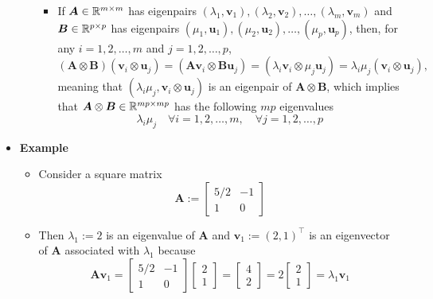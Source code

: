 \documentclass[12pt,a4paper]{article}
\begin{document}
\begin{itemize}
\begin{itemize}
\begin{itemize}
  \item If $\bm{A}\in \mathbb{R}^{m\times m}$ has eigenpairs $(\lambda_{1},\bm{v}_{1}),(\lambda_{2},\bm{v}_{2}),\ldots,(\lambda_{m},\bm{v}_{m})$
      and $\bm{B}\in \mathbb{R}^{p\times p}$ has eigenpairs $(\mu_{1},\bm{u}_{1}),(\mu_{2},\bm{u}_{2}),\ldots,(\mu_{p},\bm{u}_{p})$,
      then, for any $i=1,2, \ldots, m$ and $j=1,2, \ldots, p$,
      \begin{equation}\nonumber%
        (\bm{A}\otimes \bm{B}) (\bm{v}_{i}\otimes \bm{u}_{j})
        =
        (\bm{A}\bm{v}_{i}\otimes \bm{B}\bm{u}_{j})
        =
        (\lambda_{i}\bm{v}_{i}\otimes \mu_{j}\bm{u}_{j})
        =
        \lambda_{i}\mu_{j} (\bm{v}_{i}\otimes \bm{u}_{j}),
      \end{equation}
      meaning that $(\lambda_{i}\mu_{j}, \bm{v}_{i}\otimes \bm{u}_{j})$ is an eigenpair of $\bm{A}\otimes \bm{B}$,
      which implies that $\bm{A}\otimes \bm{B}\in \mathbb{R}^{mp\times mp}$ has the following $mp$ eigenvalues
      \begin{equation}\nonumber%
        \lambda_{i}\mu_{j} \quad \forall i = 1, 2, \ldots, m, \quad \forall j= 1,2, \ldots, p
      \end{equation}
    \end{itemize}
  \end{itemize}

\clearpage
\item \textbf{Example}
  \begin{itemize}
  \item Consider a square matrix
    \begin{equation}\nonumber%
      \bm{A} :=
      \begin{bmatrix}
        5/2 & -1 \\
        1 & 0
      \end{bmatrix}
    \end{equation}
  \item Then
    $\lambda_{1}:=2$ is an eigenvalue of $\bm{A}$
    and $\bm{v}_{1}:=(2, 1)^{\top}$ is an eigenvector of $\bm{A}$ associated with $\lambda_{1}$
    because
    \begin{equation}\nonumber%
      \bm{A}
      \bm{v}_{1}
      = 
      \begin{bmatrix}
        5/2 & -1 \\
        1 & 0
      \end{bmatrix}
      \begin{bmatrix}
        2 \\
        1
      \end{bmatrix}
      = 
      \begin{bmatrix}
        4 \\
        2
      \end{bmatrix}
      = 2
      \begin{bmatrix}
        2 \\
        1
      \end{bmatrix}
      = \lambda_{1}\bm{v}_{1}
    \end{equation}


\end{itemize}
\end{itemize}
\end{document}
